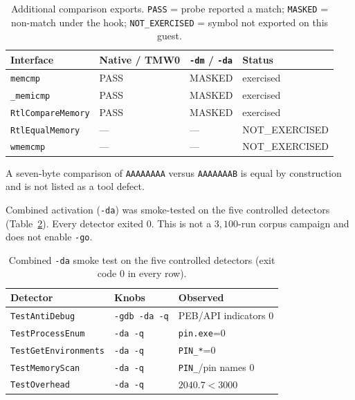 \begin{table}[t]
\caption{Additional comparison exports. \texttt{PASS} = probe reported a match; \texttt{MASKED} = non-match under the hook; \texttt{NOT\_EXERCISED} = symbol not exported on this guest.}
\label{tab:memcmp_family}
\centering
\small
\begin{tabular}{llll}
\toprule
\textbf{Interface} & \textbf{Native / TMW0} & \texttt{-dm} / \texttt{-da} & \textbf{Status} \\
\midrule
\texttt{memcmp} & PASS & MASKED & exercised \\
\texttt{\_memicmp} & PASS & MASKED & exercised \\
\texttt{RtlCompareMemory} & PASS & MASKED & exercised \\
\texttt{RtlEqualMemory} & --- & --- & NOT\_EXERCISED \\
\texttt{wmemcmp} & --- & --- & NOT\_EXERCISED \\
\bottomrule
\end{tabular}
\vspace{3pt}
\parbox{\columnwidth}{\footnotesize
A seven-byte comparison of \texttt{AAAAAAAA} versus \texttt{AAAAAAAB} is equal by construction and is not listed as a tool defect.
}
\end{table}

Combined activation (\texttt{-da}) was smoke-tested on the five controlled detectors (Table~\ref{tab:da_smoke}). Every detector exited 0. This is not a $3{,}100$-run corpus campaign and does not enable \texttt{-go}.

\begin{table}[t]
\caption{Combined \texttt{-da} smoke test on the five controlled detectors (exit code 0 in every row).}
\label{tab:da_smoke}
\centering
\small
\begin{tabular}{lll}
\toprule
\textbf{Detector} & \textbf{Knobs} & \textbf{Observed} \\
\midrule
\texttt{TestAntiDebug} & \texttt{-gdb -da -q} & PEB/API indicators 0 \\
\texttt{TestProcessEnum} & \texttt{-da -q} & \texttt{pin.exe}=0 \\
\texttt{TestGetEnvironments} & \texttt{-da -q} & \texttt{PIN\_*}=0 \\
\texttt{TestMemoryScan} & \texttt{-da -q} & \texttt{PIN\_}/pin names 0 \\
\texttt{TestOverhead} & \texttt{-da -q} & $2040.7<3000$ \\
\bottomrule
\end{tabular}
\end{table}

